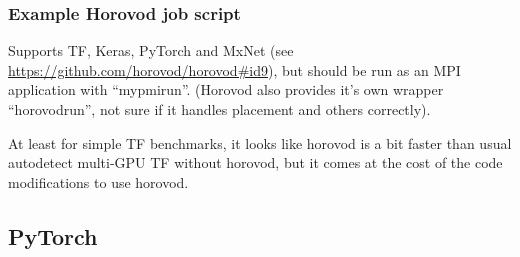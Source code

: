 \subsubsection{Example Horovod job script}
\label{sec:gpu_ugent_software_horovod_example_job_script}

Supports TF, Keras, PyTorch and MxNet (see \url{https://github.com/horovod/horovod#id9}), but should be run as an MPI application with ``mypmirun''.
(Horovod also provides it's own wrapper ``horovodrun'', not sure if it handles placement and others correctly).

At least for simple TF benchmarks, it looks like horovod is a bit faster than usual autodetect multi-GPU TF without horovod, but it comes at the
cost of the code modifications to use horovod.






\subsection{PyTorch}
\label{sec:gpu_ugent_software_pytorch}
